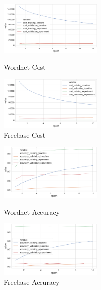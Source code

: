 \begin{figure}[H]
	\parbox{.5\linewidth}{
   		\centering
    		\includegraphics[width=0.45\textwidth, height=0.2\textheight]{Wordnet_Cost_Results_Early_Stopping}
		\caption{Wordnet Cost}
		}
	\hfill
	\parbox{.5\linewidth}{
   		\centering
		\includegraphics[width=0.45\textwidth, height=0.2\textheight]{Freebase_Cost_Results}
		\caption{Freebase Cost}
		}
\end{figure}

\begin{figure}[H]
	\parbox{.5\linewidth}{
   		\centering
    		\includegraphics[width=0.45\textwidth, height=0.2\textheight]{Wordnet_Accuracy_Results_Early_Stopping}
		\caption{Wordnet Accuracy}
		}
	\hfill
	\parbox{.5\linewidth}{
   		\centering
		\includegraphics[width=0.45\textwidth, height=0.2\textheight]{Freebase_Accuracy_Results}
		\caption{Freebase Accuracy}
		}
\end{figure}

